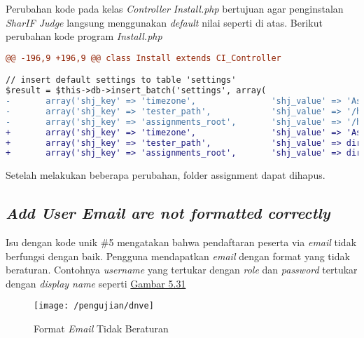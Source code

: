 	Perubahan kode pada kelas \textit{Controller Install.php} bertujuan agar penginstalan \textit{SharIF Judge} langsung menggunakan \textit{default} nilai seperti di atas. Berikut perubahan kode program
	\textit{Install.php}
\begin{lstlisting}[language=diff, basicstyle=\ttfamily, frame=single,
columns=fullflexible, keepspaces=true, breaklines=true]
@@ -196,9 +196,9 @@ class Install extends CI_Controller

// insert default settings to table 'settings'
$result = $this->db->insert_batch('settings', array(
-   	array('shj_key' => 'timezone',               'shj_value' => 'Asia/Tehran'),
-       array('shj_key' => 'tester_path',            'shj_value' => '/home/shj/tester'),
-       array('shj_key' => 'assignments_root',       'shj_value' => '/home/shj/assignments'),
+       array('shj_key' => 'timezone',               'shj_value' => 'Asia/Jakarta'),
+       array('shj_key' => 'tester_path',            'shj_value' => dirname(__FILE__, 3) . "/restricted/tester"),
+       array('shj_key' => 'assignments_root',       'shj_value' => dirname(__FILE__, 3) . "/restricted/assignments"),
\end{lstlisting}
	Setelah melakukan beberapa perubahan, folder assignment dapat dihapus.
	
	\subsection{\textit{Add User Email are not formatted correctly}}
	Isu dengan kode unik \#5 mengatakan bahwa pendaftaran peserta via \textit{email} tidak berfungsi dengan baik. Pengguna mendapatkan \textit{email} dengan format yang tidak beraturan. Contohnya \textit{username} yang tertukar dengan \textit{role} dan \textit{password} tertukar dengan \textit{display name} seperti \hyperref[fig:dnve]{Gambar 5.31} 
	\begin{figure}[H]
		\centering  
		\texttt{[image: /pengujian/dnve]}  
		\caption[Format \textit{Email} Tidak Beraturan]{Format \textit{Email} Tidak Beraturan} 
		\label{fig:dnve} 
	\end{figure}


